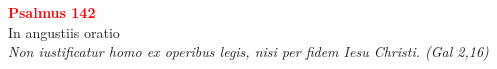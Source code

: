 


\def\greinitialformat#1{%
{\fontsize{39}{39}\selectfont #1}%
}




\vspace{0.3cm}
\begin{center}
 \textcolor{red}{\large \bf Psalmus 142}\\
In angustiis oratio\\
\textit{\small Non iustificatur homo ex operibus legis, nisi per fidem Iesu Christi. (Gal 2,16)}
\end{center}
